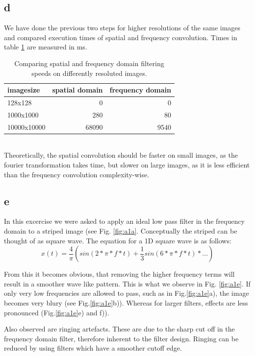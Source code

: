\documentclass[11pt,a4paper]{article}
\begin{document}
\subsection{d}
We have done the previous two steps for higher resolutions of the same images and compared execution times of spatial and frequency convolution. Times in table \ref{tbl:t4} are measured in ms.
\begin{table}
\begin{tabular}{|l|r|r|}
imagesize&spatial domain&frequency domain\\\hline
128x128&0&0\\
1000x1000&280&80\\
10000x10000&68090&9540\\
\end{tabular}
\caption{Comparing spatial and frequency domain filtering speeds on differently resoluted images.}
\label{tbl:t4}
\end{table}
\\
Theoretically, the spatial convolution should be faster on small images, as the fourier transformation takes time, but slower on large images, as it is less efficient than the frequency convolution complexity-wise.

\subsection{e}
In this excercise we were asked to apply an ideal low pass filter in the frequency domain to a striped image (see Fig. \ref{fig:a1a}. Conceptually the striped can be thought of as square wave. The equation for a 1D square wave is as follows:
\begin{equation}
x(t)=\frac{4}{\pi}(sin(2*\pi*f*t)+\frac{1}{3}sin(6*\pi*f*t)*...)
\end{equation}

From this it becomes obvious, that removing the higher frequency terms will result in a smoother wave like pattern. This is what we observe in Fig. \ref{fig:a1e}. If only very low frequencies are allowed to pass, such as in Fig.\ref{fig:a1e}a), the image becomes very blury (see Fig.\ref{fig:a1e}b)). Whereas for larger filters, effects are less pronounced (Fig.\ref{fig:a1e}e) and f)).

Also observed are ringing artefacts. These are due to the sharp cut off in the frequency domain filter, therefore inherent to the filter design. Ringing can be reduced by using filters which have a smoother cutoff edge. 
\end{document}
